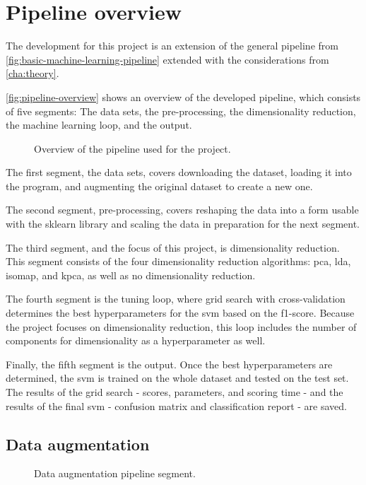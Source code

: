 \section{Pipeline overview}\label{sec:pipeline-overview}
The development for this project is an extension of the general pipeline from \autoref{fig:basic-machine-learning-pipeline} extended with the considerations from \autoref{cha:theory}.

\autoref{fig:pipeline-overview} shows an overview of the developed pipeline, which consists of five segments: The data sets, the pre-processing, the dimensionality reduction, the machine learning loop, and the output.


\begin{figure}[b!]
    \centering
    
    \caption{Overview of the pipeline used for the project.}
    \label{fig:pipeline-overview}
\end{figure}


The first segment, the data sets, covers downloading the dataset, loading it into the program, and augmenting the original dataset to create a new one.

The second segment, pre-processing, covers reshaping the data into a form usable with the \gls{sklearn} library and scaling the data in preparation for the next segment.

The third segment, and the focus of this project, is dimensionality reduction. This segment consists of the four dimensionality reduction algorithms: \gls{pca}, \gls{lda}, \gls{isomap}, and \gls{kpca}, as well as no dimensionality reduction.

The fourth segment is the tuning loop, where grid search with cross-validation determines the best hyperparameters for the \gls{svm} based on the f1-score. Because the project focuses on dimensionality reduction, this loop includes the number of components for dimensionality as a hyperparameter as well.

Finally, the fifth segment is the output. Once the best hyperparameters are determined, the \gls{svm} is trained on the whole dataset and tested on the test set. The results of the grid search - scores, parameters, and scoring time - and the results of the final \gls{svm} - confusion matrix and classification report - are saved.


\subsection{Data augmentation}

\begin{figure}[htb!]
    \centering
    
    \caption{Data augmentation pipeline segment.}
\end{figure}